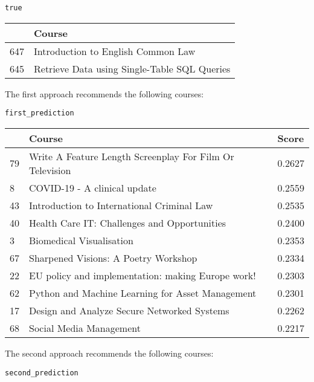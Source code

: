 \begin{verbatim}
true
\end{verbatim}

\begin{table}[H]
\small
\begin{tabular}{|p{0.5cm}|p{10cm}|}
\hline
& Course \\
\hline
647 & Introduction to English Common Law \\
645 & Retrieve Data using Single-Table SQL Queries \\
\hline
\end{tabular}
\end{table}

\newpage
\noindent The first approach recommends the following courses:

\begin{verbatim}
first_prediction
\end{verbatim}

\begin{table}[H]
\small
\begin{tabular}{|p{0.5cm}|p{10cm}|p{1.5cm}|}
\hline
& Course & Score \\
\hline
79 & Write A Feature Length Screenplay For Film Or Television & 0.2627 \\
8 & COVID-19 - A clinical update & 0.2559 \\
43 & Introduction to International Criminal Law & 0.2535 \\
40 & Health Care IT: Challenges and Opportunities & 0.2400 \\
3 & Biomedical Visualisation & 0.2353 \\
67 & Sharpened Visions: A Poetry Workshop & 0.2334 \\
22 & EU policy and implementation: making Europe work! & 0.2303 \\
62 & Python and Machine Learning for Asset Management & 0.2301 \\
17 & Design and Analyze Secure Networked Systems & 0.2262 \\
68 & Social Media Management & 0.2217 \\
\hline
\end{tabular}
\end{table}

\noindent The second approach recommends the following courses:

\begin{verbatim}
second_prediction
\end{verbatim}


